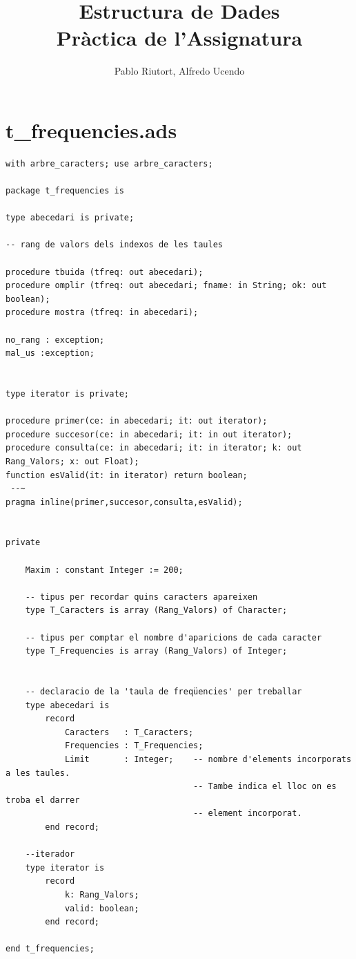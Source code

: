 \documentclass[a4paper,12pt]{article}
\title{\Huge{Estructura de Dades}\\\vspace{1cm} \Huge{\textbf{Pràctica de l'Assignatura}}}
\author{Pablo Riutort, Alfredo Ucendo}
\begin{document}
\maketitle
\pagebreak
\tableofcontents
\pagebreak

\lstset{basicstyle=\footnotesize\ttfamily,breaklines=true}
\lstset{framextopmargin=50pt,frame=bottomline}

\section{t\_frequencies.ads}

\begin{lstlisting}
with arbre_caracters; use arbre_caracters;

package t_frequencies is

type abecedari is private;

-- rang de valors dels indexos de les taules

procedure tbuida (tfreq: out abecedari);
procedure omplir (tfreq: out abecedari; fname: in String; ok: out boolean);
procedure mostra (tfreq: in abecedari);

no_rang : exception;
mal_us :exception;


type iterator is private;

procedure primer(ce: in abecedari; it: out iterator);
procedure succesor(ce: in abecedari; it: in out iterator);
procedure consulta(ce: in abecedari; it: in iterator; k: out Rang_Valors; x: out Float);
function esValid(it: in iterator) return boolean;
 --~ 
pragma inline(primer,succesor,consulta,esValid);


private 

	Maxim : constant Integer := 200;

	-- tipus per recordar quins caracters apareixen
	type T_Caracters is array (Rang_Valors) of Character; 
	
	-- tipus per comptar el nombre d'aparicions de cada caracter
	type T_Frequencies is array (Rang_Valors) of Integer; 


	-- declaracio de la 'taula de freqüencies' per treballar
	type abecedari is 
		record 
			Caracters   : T_Caracters;  
			Frequencies : T_Frequencies;  
			Limit       : Integer;    -- nombre d'elements incorporats a les taules. 
                                      -- Tambe indica el lloc on es troba el darrer
                                      -- element incorporat.
		end record; 

	--iterador
	type iterator is
		record
			k: Rang_Valors;
			valid: boolean;
		end record;
   
end t_frequencies;

\end{lstlisting}
\end{document}
